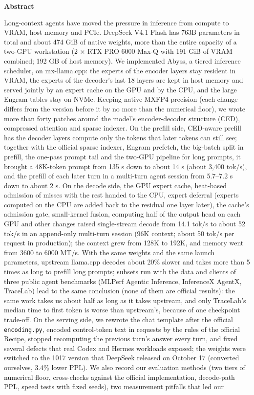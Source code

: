 \documentclass[11pt,a4paper]{article}
\newcommand{\code}[1]{\texttt{#1}}
\newcommand{\tps}{tok/s}
\begin{document}
\vspace{0.4em}
\begin{center}{\large\bfseries Abstract}\end{center}
\vspace{-0.3em}
\noindent
Long-context agents have moved the pressure in inference from compute to VRAM, host memory and PCIe. DeepSeek-V4.1-Flash has 763B parameters in total and about 474 GiB of native weights, more than the entire capacity of a two-GPU workstation (2 × RTX PRO 6000 Max-Q with 191 GiB of VRAM combined; 192 GB of host memory). We implemented Abyss, a tiered inference scheduler, on mx-llama.cpp: the experts of the encoder layers stay resident in VRAM, the experts of the decoder's last 18 layers are kept in host memory and served jointly by an expert cache on the GPU and by the CPU, and the large Engram tables stay on NVMe. Keeping native MXFP4 precision (each change differs from the version before it by no more than the numerical floor), we wrote more than forty patches around the model's encoder-decoder structure (CED), compressed attention and sparse indexer. On the prefill side, CED-aware prefill has the decoder layers compute only the tokens that later tokens can still see; together with the official sparse indexer, Engram prefetch, the big-batch split in prefill, the one-pass prompt tail and the two-GPU pipeline for long prompts, it brought a 48K-token prompt from 135 s down to about 14 s (about 3,400 \tps{}), and the prefill of each later turn in a multi-turn agent session from 5.7--7.2 s down to about 2 s. On the decode side, the GPU expert cache, heat-based admission of misses with the rest handed to the CPU, expert deferral (experts computed on the CPU are added back to the residual one layer later), the cache's admission gate, small-kernel fusion, computing half of the output head on each GPU and other changes raised single-stream decode from 14.1 \tps{} to about 52 \tps{} in an append-only multi-turn session (96K context; about 50 \tps{} per request in production); the context grew from 128K to 192K, and memory went from 3600 to 6000 MT/s. With the same weights and the same launch parameters, upstream llama.cpp decodes about 20\% slower and takes more than 5 times as long to prefill long prompts; subsets run with the data and clients of three public agent benchmarks (MLPerf Agentic Inference, InferenceX AgentX, TraceLab) lead to the same conclusion (none of them are official results): the same work takes us about half as long as it takes upstream, and only TraceLab's median time to first token is worse than upstream's, because of one checkpoint trade-off. On the serving side, we rewrote the chat template after the official \code{encoding.py}, encoded control-token text in requests by the rules of the official Recipe, stopped recomputing the previous turn's answer every turn, and fixed several defects that real Codex and Hermes workloads exposed; the weights were switched to the 1017 version that DeepSeek released on October 17 (converted ourselves, 3.4\% lower PPL). We also record our evaluation methods (two tiers of numerical floor, cross-checks against the official implementation, decode-path PPL, speed tests with fixed seeds), two measurement pitfalls that led our 
\end{document}
